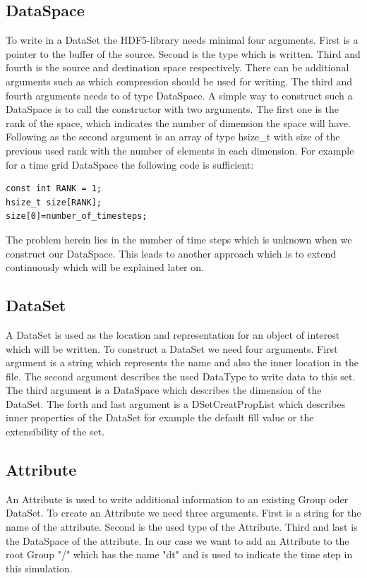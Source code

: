\documentclass{article}
\begin{document}
\subsection{DataSpace}
To write in a DataSet the HDF5-library needs minimal four arguments. First is a pointer to the buffer of the source. Second is the type which is written. Third and fourth is the source and destination space respectively. There can be additional arguments such as which compression should be used for writing. The third and fourth arguments needs to of type DataSpace. A simple way to construct such a DataSpace is to call the constructor with two arguments. The first one is the rank of the space, which indicates the number of dimension the space will have. Following as the second argument is an array of type hsize\_t with size of the previous used rank with the number of elements in each dimension. For example for a time grid DataSpace the following code is sufficient:\\

\begin{lstlisting}
const int RANK = 1;
hsize_t size[RANK];
size[0]=number_of_timesteps;
\end{lstlisting}

The problem herein lies in the number of time steps which is unknown when we construct our DataSpace. This leads to another approach which is to extend continuously which will be explained later on.
\subsection{DataSet}
A DataSet is used as the location and representation for an object of interest which will be written. To construct a DataSet we need four arguments. First argument is a string which represents the name and also the inner location in the file. The second argument describes the used DataType to write data to this set. The third argument is a DataSpace which describes the dimension of the DataSet. The forth and last argument is a DSetCreatPropList which describes inner properties of the DataSet for example the default fill value or the extensibility of the set.
\subsection{Attribute}
An Attribute is used to write additional information to an existing Group oder DataSet. To create an Attribute we need three arguments. First is a string for the name of the attribute. Second is the used type of the Attribute. Third and last is the DataSpace of the attribute. In our case we want to add an Attribute to the root Group "/" which has the name "dt" and is used to indicate the time step in this simulation.
\end{document}
